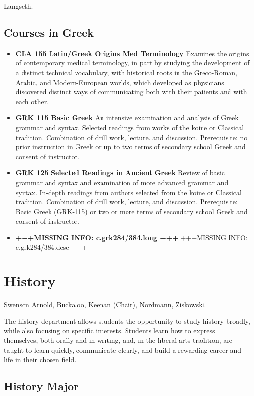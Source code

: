 \documentclass[
  letterpaper,
]{scrbook}
\providecommand{\tightlist}{%
  \setlength{\itemsep}{0pt}\setlength{\parskip}{0pt}}
\begin{document}
Langseth.

\subsection{Courses in Greek}\label{courses-in-greek}

\begin{itemize}
\tightlist
\item
  \textbf{CLA 155 Latin/Greek Origins Med Terminology} Examines the
  origins of contemporary medical terminology, in part by studying the
  development of a distinct technical vocabulary, with historical roots
  in the Greco-Roman, Arabic, and Modern-European worlds, which
  developed as physicians discovered distinct ways of communicating both
  with their patients and with each other.
\item
  \textbf{GRK 115 Basic Greek} An intensive examination and analysis of
  Greek grammar and syntax. Selected readings from works of the koine or
  Classical tradition. Combination of drill work, lecture, and
  discussion. Prerequisite: no prior instruction in Greek or up to two
  terms of secondary school Greek and consent of instructor.
\item
  \textbf{GRK 125 Selected Readings in Ancient Greek} Review of basic
  grammar and syntax and examination of more advanced grammar and
  syntax. In-depth readings from authors selected from the koine or
  Classical tradition. Combination of drill work, lecture, and
  discussion. Prerequisite: Basic Greek (GRK-115) or two or more terms
  of secondary school Greek and consent of instructor.
\item
  \textbf{+++MISSING INFO: c.grk284/384.long +++} +++MISSING INFO:
  c.grk284/384.desc +++
\end{itemize}

\section{History}\label{sec-history}

Swenson Arnold, Buckaloo, Keenan (Chair), Nordmann, Ziskowski.

The history department allows students the opportunity to study history
broadly, while also focusing on specific interests. Students learn how
to express themselves, both orally and in writing, and, in the liberal
arts tradition, are taught to learn quickly, communicate clearly, and
build a rewarding career and life in their chosen field.

\subsection{History Major}\label{history-major}
\end{document}
